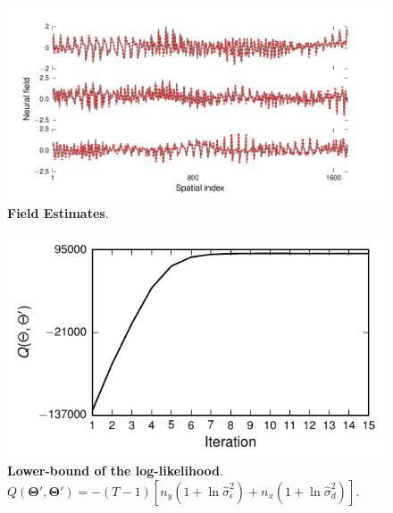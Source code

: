 \documentclass[]{article}
\begin{document}
\begin{figure}[!ht]
\begin{center}
\includegraphics[scale=1]{./Figures/FieldEstimates.pdf}
\end{center}
\caption{{\bf Field Estimates}. }
\label{fig:FieldEstimates}
\end{figure}
\begin{figure}[!ht]
\begin{center}
\includegraphics{./Figures/Q.pdf}
\end{center}
\caption{{\bf Lower-bound of the log-likelihood}. $Q(\boldsymbol\Theta',\boldsymbol\Theta')=-(T-1)\left[n_y(1+\ln \hat{\sigma}^2_{\epsilon})+ n_x(1+\ln \hat{\sigma}^2_d)\right]$.}
\label{fig:LowerBound}
\end{figure}




% 
\end{document}
